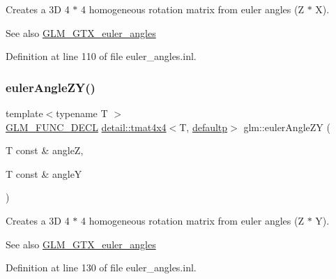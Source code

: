Creates a 3D 4 $\ast$ 4 homogeneous rotation matrix from euler angles (Z $\ast$ X). \begin{DoxySeeAlso}{See also}
\hyperlink{group__gtx__euler__angles}{G\+L\+M\+\_\+\+G\+T\+X\+\_\+euler\+\_\+angles} 
\end{DoxySeeAlso}


Definition at line 110 of file euler\+\_\+angles.\+inl.

\mbox{\label{group__gtx__euler__angles_gaeabd76319f5a19188a0423769950df76}} 
\subsubsection{\texorpdfstring{euler\+Angle\+Z\+Y()}{eulerAngleZY()}}
{\footnotesize\ttfamily template$<$typename T $>$ \\
\hyperlink{setup_8hpp_ab2d052de21a70539923e9bcbf6e83a51}{G\+L\+M\+\_\+\+F\+U\+N\+C\+\_\+\+D\+E\+CL} \hyperlink{structglm_1_1detail_1_1tmat4x4}{detail\+::tmat4x4}$<$T, \hyperlink{namespaceglm_a0f04f086094c747d227af4425893f545a9d21ccd8b5a009ec7eb7677befc3bf51}{defaultp}$>$ glm\+::euler\+Angle\+ZY (\begin{DoxyParamCaption}\item[{T const \&}]{angleZ,  }\item[{T const \&}]{angleY }\end{DoxyParamCaption})}

Creates a 3D 4 $\ast$ 4 homogeneous rotation matrix from euler angles (Z $\ast$ Y). \begin{DoxySeeAlso}{See also}
\hyperlink{group__gtx__euler__angles}{G\+L\+M\+\_\+\+G\+T\+X\+\_\+euler\+\_\+angles} 
\end{DoxySeeAlso}


Definition at line 130 of file euler\+\_\+angles.\+inl.

\mbox{\label{group__gtx__euler__angles_gab39476f0decc117783e02ba389a04ee7}} 
